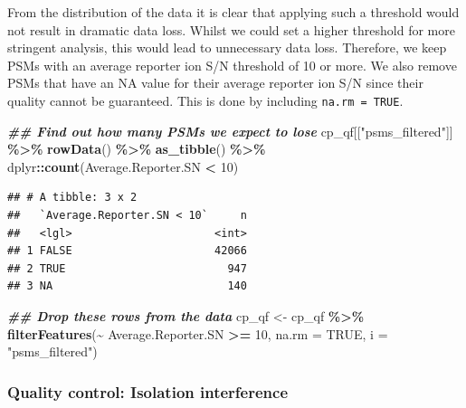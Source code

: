 \documentclass[9pt,a4paper,]{extarticle}
\newenvironment{Shaded}{\begin{snugshade}}{\end{snugshade}}
\newcommand{\AttributeTok}[1]{\textcolor[rgb]{0.13,0.29,0.53}{#1}}
\newcommand{\ConstantTok}[1]{\textcolor[rgb]{0.56,0.35,0.01}{#1}}
\newcommand{\DecValTok}[1]{\textcolor[rgb]{0.00,0.00,0.81}{#1}}
\newcommand{\DocumentationTok}[1]{\textcolor[rgb]{0.56,0.35,0.01}{\textbf{\textit{#1}}}}
\newcommand{\FunctionTok}[1]{\textcolor[rgb]{0.13,0.29,0.53}{\textbf{#1}}}
\newcommand{\NormalTok}[1]{#1}
\newcommand{\OtherTok}[1]{\textcolor[rgb]{0.56,0.35,0.01}{#1}}
\newcommand{\SpecialCharTok}[1]{\textcolor[rgb]{0.81,0.36,0.00}{\textbf{#1}}}
\newcommand{\StringTok}[1]{\textcolor[rgb]{0.31,0.60,0.02}{#1}}
\begin{document}
From the distribution of the data it is clear that applying such a threshold
would not result in dramatic data loss. Whilst we could set a higher threshold
for more stringent analysis, this would lead to unnecessary data loss.
Therefore, we keep PSMs with an average reporter ion S/N threshold of 10 or more.
We also remove PSMs that have an NA value for their average reporter ion
S/N since their quality cannot be guaranteed. This is done by including \texttt{na.rm\ =\ TRUE}.

\begin{Shaded}
\begin{Highlighting}[]
\DocumentationTok{\#\# Find out how many PSMs we expect to lose}
\NormalTok{cp\_qf[[}\StringTok{"psms\_filtered"}\NormalTok{]] }\SpecialCharTok{\%\textgreater{}\%} 
  \FunctionTok{rowData}\NormalTok{() }\SpecialCharTok{\%\textgreater{}\%} 
  \FunctionTok{as\_tibble}\NormalTok{() }\SpecialCharTok{\%\textgreater{}\%} 
\NormalTok{  dplyr}\SpecialCharTok{::}\FunctionTok{count}\NormalTok{(Average.Reporter.SN }\SpecialCharTok{\textless{}} \DecValTok{10}\NormalTok{)}
\end{Highlighting}
\end{Shaded}

\begin{verbatim}
## # A tibble: 3 x 2
##   `Average.Reporter.SN < 10`     n
##   <lgl>                      <int>
## 1 FALSE                      42066
## 2 TRUE                         947
## 3 NA                           140
\end{verbatim}

\begin{Shaded}
\begin{Highlighting}[]
\DocumentationTok{\#\# Drop these rows from the data}
\NormalTok{cp\_qf }\OtherTok{\textless{}{-}}\NormalTok{ cp\_qf }\SpecialCharTok{\%\textgreater{}\%}
  \FunctionTok{filterFeatures}\NormalTok{(}\SpecialCharTok{\textasciitilde{}}\NormalTok{ Average.Reporter.SN }\SpecialCharTok{\textgreater{}=} \DecValTok{10}\NormalTok{, }
                 \AttributeTok{na.rm =} \ConstantTok{TRUE}\NormalTok{,}
                 \AttributeTok{i =} \StringTok{"psms\_filtered"}\NormalTok{)}
\end{Highlighting}
\end{Shaded}

\hypertarget{quality-control-isolation-interference}{%
\subsubsection{Quality control: Isolation interference}\label{quality-control-isolation-interference}}
\end{document}
